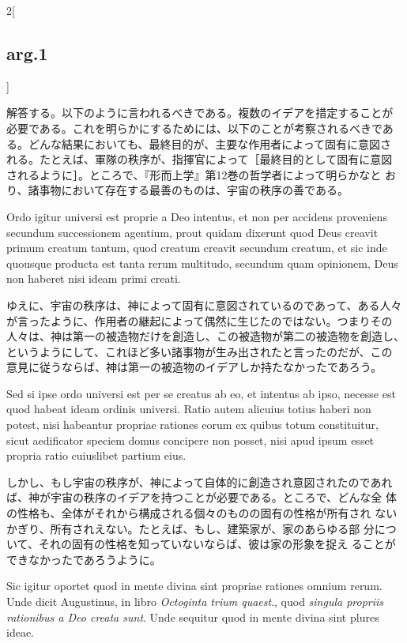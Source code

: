 \documentclass[paper=a4paper,fontsize=10pt,jafontsize=9pt,titlepage]{jlreq}
\begin{document}
\begin{paracol}{2}[\subsection{arg.1}]
\switchcolumn

解答する。以下のように言われるべきである。複数のイデアを措定することが
必要である。これを明らかにするためには、以下のことが考察されるべきであ
る。どんな結果においても、最終目的が、主要な作用者によって固有に意図さ
れる。たとえば、軍隊の秩序が、指揮官によって［最終目的として固有に意図
されるように］。ところで、『形而上学』第12巻の哲学者によって明らかなと
おり、諸事物において存在する最善のものは、宇宙の秩序の善である。

\switchcolumn*

Ordo igitur universi est proprie a Deo intentus, et non per
accidens proveniens secundum successionem agentium, prout quidam
dixerunt quod Deus creavit primum creatum tantum, quod creatum creavit
secundum creatum, et sic inde quousque producta est tanta rerum
multitudo, secundum quam opinionem, Deus non haberet nisi ideam primi
creati.

\switchcolumn

ゆえに、宇宙の秩序は、神によって固有に意図されているのであって、ある人々
が言ったように、作用者の継起によって偶然に生じたのではない。つまりその
人々は、神は第一の被造物だけを創造し、この被造物が第二の被造物を創造し、
というようにして、これほど多い諸事物が生み出されたと言ったのだが、この
意見に従うならば、神は第一の被造物のイデアしか持たなかったであろう。

\switchcolumn*

Sed si ipse ordo universi est per se creatus ab eo, et intentus ab
ipso, necesse est quod habeat ideam ordinis universi. Ratio autem
alicuius totius haberi non potest, nisi habeantur propriae rationes
eorum ex quibus totum constituitur, sicut aedificator speciem domus
concipere non posset, nisi apud ipsum esset propria ratio cuiuslibet
partium eius.

\switchcolumn

しかし、もし宇宙の秩序が、神によって自体的に創造され意図されたのであれ
 ば、神が宇宙の秩序のイデアを持つことが必要である。ところで、どんな全
 体の性格も、全体がそれから構成される個々のものの固有の性格が所有され
 ないかぎり、所有されえない。たとえば、もし、建築家が、家のあらゆる部
 分について、それの固有の性格を知っていないならば、彼は家の形象を捉え
 ることができなかったであろうように。

\switchcolumn*

Sic igitur oportet quod in mente divina sint propriae rationes omnium
rerum. Unde dicit Augustinus, in libro {\itshape Octoginta trium
quaest}., quod {\itshape singula propriis rationibus a Deo creata
sunt}. Unde sequitur quod in mente divina sint plures ideae.


\end{paracol}
\end{document}
